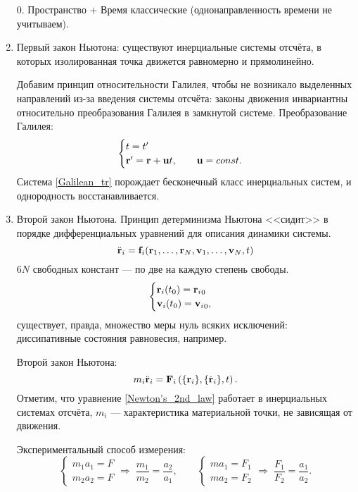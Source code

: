 \documentclass[12pt, a4paper]{article}
\begin{document}
\begin{enumerate}
\item[0.] Пространство $+$ Время классические (однонаправленность времени не учитываем).
\item Первый закон Ньютона:  существуют инерциальные системы отсчёта, в которых изолированная точка движется равномерно и прямолинейно.

Добавим принцип относительности Галилея, чтобы не возникало выделенных направлений из-за введения системы отсчёта: законы движения инвариантны относительно преобразования Галилея в замкнутой системе. Преобразование Галилея:
\begin{equation}
\begin{cases}
t = t'\\
\vb{r'} = \vb{r} + \vb{u}t, \qquad \vb{u} = const.
\end{cases}
\label{Galilean_tr}
\end{equation}
Система \eqref{Galilean_tr} порождает бесконечный класс инерциальных систем, и однородность восстанавливается.

\item Второй закон Ньютона.  Принцип детерминизма Ньютона <<сидит>> в порядке дифференциальных уравнений для описания динамики системы.
\begin{equation*}
\Ddot{\vb{r}}_i = \vb{f}_i (\vb{r}_1, \dots, \vb{r}_N, \vb{v}_1, \dots, \vb{v}_N, t) 
\end{equation*}
$6N$ свободных констант --- по две на каждую степень свободы.
\begin{equation*}
\begin{cases}
\vb{r}_i (t_0) = {\vb{r}_i}_0\\
\vb{v}_i (t_0) = {\vb{v}_i}_0,
\end{cases}
\end{equation*}
существует, правда, множество меры нуль всяких исключений: диссипативные состояния равновесия, например.

Второй закон Ньютона:
\begin{equation}
m_i \ddot{\vb{r}}_i = \vb{F}_i \left(\{\vb{r}_i\}, \{\dot{\vb{r}}_i\}, t\right).
\label{Newton's_2nd_law}
\end{equation}
Отметим, что уравнение \eqref{Newton's_2nd_law} работает в инерциальных системах отсчёта, $m_i$ --- характеристика материальной точки, не зависящая от движения.

Экспериментальный способ измерения:
\begin{equation*}
\begin{cases}
m_1 a_1 = F\\
m_2 a_2 = F
\end{cases}
\Rightarrow \; \frac{m_1}{m_2} = \frac{a_2}{a_1}, \qquad
\begin{cases}
ma_1 = F_1\\
ma_2 = F_2
\end{cases}
\Rightarrow \; \frac{F_1}{F_2} = \frac{a_1}{a_2}.
\end{equation*}

\end{enumerate}
\end{document}
